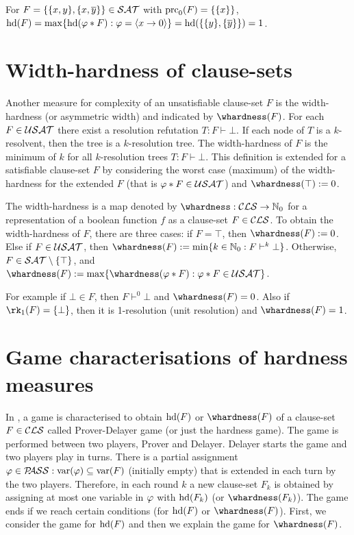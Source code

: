 \documentclass{report}
\begin{document}
\begin{examp}\label{exp:hd-extd}
For $F = \{ \{ x, y \} , \{ x,\overline y \} \} \in \mathcal{SAT}$ with $\operatorname{prc}_0(F) = \{ \{ x \} \}$,  $\operatorname{hd}(F)= \max \{  \operatorname{hd}(\varphi * F) : \varphi =\langle x \rightarrow 0 \rangle  \}=\operatorname{hd}(\{ \{ y \},\{ \overline y \} \})=1$.
\end{examp}

\section{Width-hardness of clause-sets}
\label{sec:whdd}

Another measure for complexity of an unsatisfiable clause-set $F$ is the width-hardness (or asymmetric width) and indicated by $\whardness(F)$. For each $F \in \mathcal{USAT}$ there exist a resolution refutation $T:F \vdash \bot$. If each node of $T$ is a $k$-resolvent, then the tree is a $k$-resolution tree. The width-hardness of $F$ is the minimum of $k$ for all $k$-resolution trees $T:F \vdash \bot$. This definition is extended for a satisfiable clause-set $F$ by considering the worst case (maximum) of the width-hardness for the extended $F$ (that is $ \varphi * F \in \mathcal{USAT}$) and $\whardness(\top):=0$.

\begin{defi}\label{def:whd-extended}
The width-hardness is a map denoted by $\whardness : \Cls \rightarrow \NNZ$ for a representation of a boolean function $f$ as a clause-set $F \in \mathcal{CLS}$. To obtain the width-hardness of  $F$, there are three cases: if $F = \top$, then $\whardness(F) := 0$. Else if $F \in \mathcal{USAT}$, then $\whardness(F) := \min \set{k \in \NNZ : F \vdash^k \bot}$. Otherwise, $F \in \mathcal{SAT} \setminus \{ \top \}$, and $\whardness(F) := \max \set{ \whardness(\vp * F) : \vp * F \in \Usat }$.
\end{defi}

For example if $\bot \in F$, then $F \vdash^0 \bot$ and $\whardness(F)=0$. Also if $\rk_1(F)=\set{\bot}$, then it is 1-resolution (unit resolution) and  $\whardness(F)=1$.

\section{Game characterisations of hardness measures}
\label{sec:game-pd}

In \cite{h18}, a game is characterised to obtain $\operatorname{hd}(F)$ or $\whardness(F)$ of a clause-set $F \in \mathcal{CLS}$ called Prover-Delayer game (or just the hardness game). The game is performed between two players, Prover and Delayer. Delayer starts the game and two players play in turns. There is a partial assignment $\varphi \in \mathcal{P\hspace{-0.32em}ASS}: \operatorname{var}(\varphi) \subseteq \operatorname{var}(F)$ (initially empty) that is extended in each turn by the two players. Therefore, in each round $k$ a new clause-set $F_k$ is obtained by assigning at most one variable in $\varphi$ with $\operatorname{hd}(F_k)$ (or $\whardness(F_k)$). The game ends if we reach certain conditions (for $\operatorname{hd}(F)$ or $\whardness(F)$). First, we consider the game for $\operatorname{hd}(F)$ and then we explain the game for $\whardness(F)$.
\end{document}
